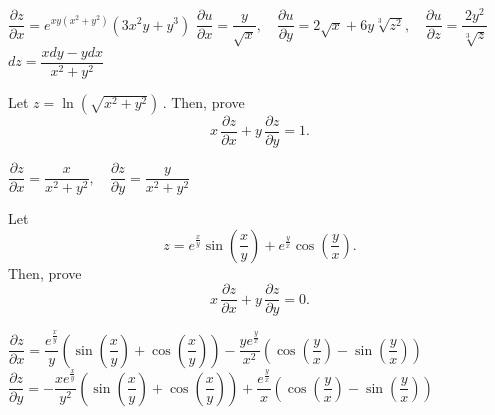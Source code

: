 \begin{Answer}
    
    \Question $\dfrac{\partial z}{\partial x} = e^{xy(x^2+y^2)} (3x^2y + y^3)$
    \Question $\dfrac{\partial u}{\partial x} = \dfrac{y}{\sqrt{x}}, \quad  \dfrac{\partial u}{\partial y} = 2\sqrt{x} + 6y \sqrt[3]{z^2}, \quad \dfrac{\partial u}{\partial z} = \dfrac{2y^2}{\sqrt[3]{z}}$ 
    \Question $dz = \dfrac{x dy - y dx}{x^2 + y^2} $ 

\end{Answer}
\fi

\ifanalysis\begin{Exercise}[difficulty = 1]\fi\ifcalculus\begin{Exercise}[difficulty = 2]\fi Let $z = \ln \left( \sqrt{x^2 + y^2} \right)\,.$ Then, prove $$x \, \dfrac{\partial z}{\partial x}+ y \, \dfrac{\partial z}{\partial y} = 1.$$  
\ifanalysis\end{Exercise}\fi\ifcalculus\end{Exercise}\fi

\begin{Answer}

    $\dfrac{\partial z}{\partial x} = \dfrac{x}{x^2 + y^2}, \quad  \dfrac{\partial z}{\partial y}= \dfrac{y}{x^2 + y^2} $
\end{Answer}

\ifanalysis\begin{Exercise}[difficulty = 2]\fi\ifcalculus\begin{Exercise}[difficulty = 3]\fi Let
$$z = e^\frac{x}{y} \sin \left( \dfrac{x}{y} \right) + e^\frac{y}{x}\cos \left( \dfrac{y}{x} \right).$$
Then, prove
$$x \, \frac{\partial z}{\partial x} + y \, \frac{\partial z}{\partial y} = 0.$$  
\ifanalysis\end{Exercise}\fi\ifcalculus\end{Exercise}\fi

\begin{Answer}

    $\dfrac{\partial z}{ \partial x} = \dfrac{e^\frac{x}{y} }{y}\left(\sin \left( \dfrac{x}{y} \right) + \cos \left( \dfrac{x}{y} \right) \right) - \dfrac{ye^\frac{y}{x} }{x^2} \left(\cos \left( \dfrac{y}{x}\right)   - \sin\left(  \dfrac{y}{x}\right) \right)$\\[0.2cm] 
$\dfrac{\partial z}{ \partial y} = -\dfrac{xe^\frac{x}{y} }{y^2}\left(\sin\left(  \dfrac{x}{y} \right)  + \cos \left( \dfrac{x}{y}\right)  \right) + \dfrac{e^\frac{y}{x}}{x} \left(\cos \left(  \dfrac{y}{x} \right)  - \sin \left( \dfrac{y}{x}\right)  \right) $
\end{Answer}


